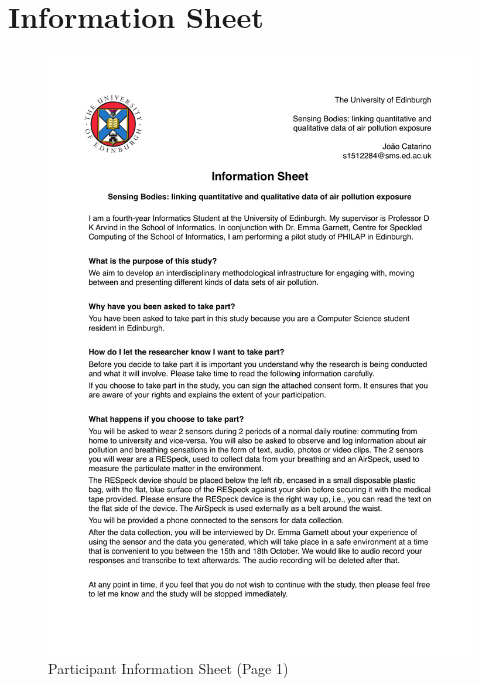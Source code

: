 \section{Information Sheet}
\label{sec:infosheet}


\begin{figure}[H]
\centering
\includegraphics[width=.8\textwidth]{pdfs/information}
\caption{Participant Information Sheet (Page 1)}
\label{infosheet}
\end{figure}

